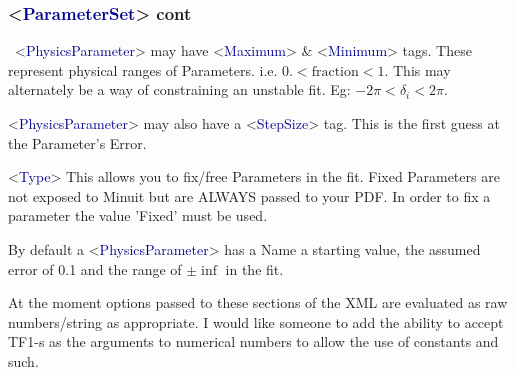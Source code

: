\documentclass{beamer}
\begin{document}
\begin{frame}
\frametitle{<\textcolor{darkblue}{ParameterSet}> cont}

\scriptsize~<\textcolor{darkblue}{PhysicsParameter}> may have <\textcolor{darkblue}{Maximum}> \& <\textcolor{darkblue}{Minimum}> tags.\newline
These represent physical ranges of Parameters. i.e. $ 0.< \text{fraction} <1.$\newline
This may alternately be a way of constraining an unstable fit.\newline
Eg: $-2\pi < \delta_i < 2\pi$.\newline


<\textcolor{darkblue}{PhysicsParameter}> may also have a <\textcolor{darkblue}{StepSize}> tag.\newline
This is the first guess at the Parameter's Error.\newline

<\textcolor{darkblue}{Type}> This allows you to fix/free Parameters in the fit.
Fixed Parameters are not exposed to Minuit but are ALWAYS passed to your PDF.\newline
In order to fix a parameter the value 'Fixed' must be used.\newline

By default a <\textcolor{darkblue}{PhysicsParameter}> has a Name a starting value, the assumed error of 0.1 and the range of $\pm\inf$ in the fit.\newline\newline

At the moment options passed to these sections of the XML are evaluated as raw numbers/string as appropriate. I would like someone to add the ability to accept TF1-s as the arguments to numerical numbers to allow the use of constants and such.

\end{frame}
\end{document}
